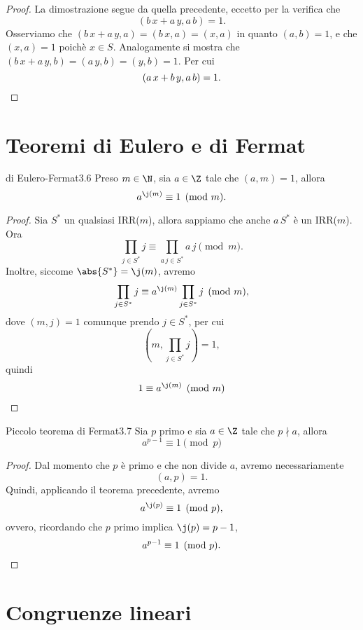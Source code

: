 \begin{proof}
	La dimostrazione segue da quella precedente, eccetto per la verifica che
	\[
		(b\,x+a\,y,a\,b) = 1.
	\]
	Osserviamo che \((b\,x+a\,y,a)=(b\,x,a) = (x,a)\) in quanto \((a,b) = 1\), e che \((x,a) = 1\) poichè \(x\in S\).
	Analogamente si mostra che \((b\,x+a\,y,b) = (a\,y,b) = (y,b) =1\).
	Per cui
	\[
		(a\,x+b\,y,a\,b) = 1.\qedhere
	\]
\end{proof}
\section{Teoremi di Eulero e di Fermat}

\begin{teor}{di Eulero-Fermat}{3.6}
	Preso \(m\in\N\), sia \(a\in\Z\) tale che \((a,m) = 1\), allora
	\[
		a^{\j(m)} \equiv 1 \pmod{m}.
	\]
\end{teor}

\begin{proof}
	Sia \(S^*\) un qualsiasi IRR(\(m\)), allora sappiamo che anche \(a\,S^*\) è un IRR(\(m\)).
	Ora
	\[
		\prod_{j\in S^*} j \equiv \prod_{a\,j \in S^*} a\,j \pmod{m}.
	\]
	Inoltre, siccome \(\abs{S^*} = \j(m)\), avremo
	\[
		\prod_{j\in S^*}j \equiv a^{\j(m)} \prod_{j\in S^*} j \pmod{m},
	\]
	dove \((m,j) = 1\) comunque prendo \(j\in S^*\), per cui
	\[
		\left( m, \prod_{j\in S^*} j \right)=1,
	\]
	quindi
	\[
		1 \equiv a^{\j(m)} \pmod{m}\qedhere
	\]
\end{proof}

\begin{teor}{Piccolo teorema di Fermat}{3.7}
	Sia \(p\) primo e sia \(a\in\Z\) tale che \(p\nmid a\), allora
	\[
		a^{p-1} \equiv 1 \pmod{p}
	\]
\end{teor}

\begin{proof}
	Dal momento che \(p\) è primo e che non divide \(a\), avremo necessariamente
	\[
		(a,p) = 1.
	\]
	Quindi, applicando il teorema precedente, avremo
	\[
		a^{\j(p)} \equiv 1 \pmod{p},
	\]
	ovvero, ricordando che \(p\) primo implica \(\j(p) = p-1\),
	\[
		a^{p-1} \equiv 1 \pmod{p}.\qedhere
	\]
\end{proof}
\section{Congruenze lineari}

